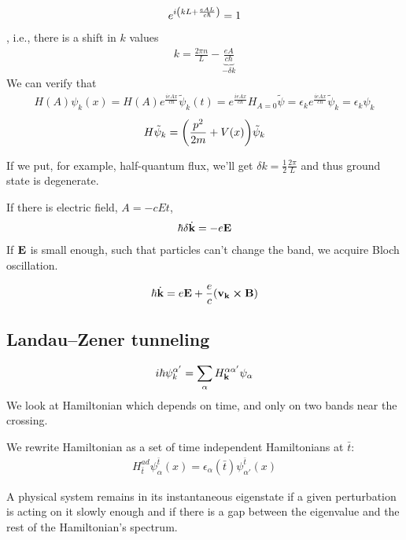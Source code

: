 \begin{align}
e^{i\qty(kL+\frac{eAL}{c\hbar})} = 1 
\end{align}
, i.e., there is a shift in $k$ values
\begin{align}
k = \frac{2\pi n}{L} - \underbrace{\frac{eA}{c\hbar} }_{- \delta k}
\end{align}
We can verify that
\begin{align}
H(A) \psi_k(x) = H(A) e^{\frac{ieAx}{c\hbar}}   \tilde{\psi}_k(t) = e^{\frac{ieAx}{c\hbar}}  H_{A=0} \tilde{\psi}= \epsilon_k e^{\frac{ieAx}{c\hbar}}  \tilde{\psi}_k = \epsilon_k \psi_k  
\end{align}
\begin{align}
H\tilde{\psi}_k = \qty(\frac{p^2}{2m} + V(x)) \tilde{\psi}_k
\end{align}

If we put, for example, half-quantum flux, we'll get $\delta k = \frac{1}{2} \frac{2\pi}{L}$ and thus ground state is degenerate.

If there is electric field, $A=-cEt$,
\begin{align}
\hbar\delta \dot{ \vb{k}} = -e\vb{E}
\end{align} 
If $\vb{E}$ is small enough, such that particles can't change the band, we acquire Bloch oscillation.

\begin{prop}
	\begin{align}
	\hbar \dot{ \vb{k}} = e\vb{E} + \frac{e}{c} \qty(\vb{v}_{\vb{k}} \cross \vb{B})
	\end{align}
\end{prop}

\subsection{Landau--Zener tunneling}
\begin{align}
i\hbar \psi_k^{\alpha'} = \sum_{\alpha} H_{\vb{k}}^{\alpha \alpha'} \psi_{\alpha}
\end{align}
We look at Hamiltonian which depends on time, and only on two bands near the crossing.

We rewrite Hamiltonian as a set of time independent Hamiltonians at $\bar{t}$:
\begin{align}
H_{\bar{t}}^{ad} \psi_{\alpha}^{\bar{t}}(x) = \epsilon_{\alpha}(\bar{t}) \psi_{\alpha'}^{\bar{t}} (x)
\end{align}
\begin{theorem}
	A physical system remains in its instantaneous eigenstate if a given perturbation is acting on it slowly enough and if there is a gap between the eigenvalue and the rest of the Hamiltonian's spectrum.
\end{theorem}

